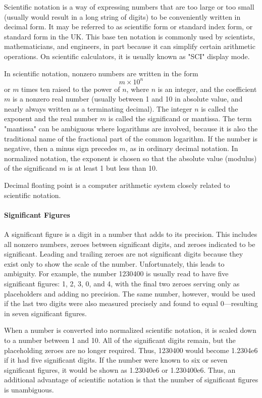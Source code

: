 Scientific notation is a way of expressing numbers that are too large or too small (usually would result in a long string of digits) to be conveniently written in decimal form. It may be referred to as scientific form or standard index form, or standard form in the UK. This base ten notation is commonly used by scientists, mathematicians, and engineers, in part because it can simplify certain arithmetic operations. On scientific calculators, it is usually known as "SCI" display mode.

In scientific notation, nonzero numbers are written in the form
$$
m \times 10^n
$$
or $m$ times ten raised to the power of $n$, where $n$ is an integer, and the coefficient $m$ is a nonzero real number (usually between 1 and 10 in absolute value, and nearly always written as a terminating decimal). The integer $n$ is called the exponent and the real number $m$ is called the significand or mantissa. The term "mantissa" can be ambiguous where logarithms are involved, because it is also the traditional name of the fractional part of the common logarithm. If the number is negative, then a minus sign precedes $m$, as in ordinary decimal notation. In normalized notation, the exponent is chosen so that the absolute value (modulus) of the significand $m$ is at least 1 but less than 10.

Decimal floating point is a computer arithmetic system closely related to scientific notation.

\paragraph{Significant Figures}

A significant figure is a digit in a number that adds to its precision. This includes all nonzero numbers, zeroes between significant digits, and zeroes indicated to be significant. Leading and trailing zeroes are not significant digits because they exist only to show the scale of the number. Unfortunately, this leads to ambiguity. For example, the number 1230400 is usually read to have five significant figures: 1, 2, 3, 0, and 4, with the final two zeroes serving only as placeholders and adding no precision. The same number, however, would be used if the last two digits were also measured precisely and found to equal 0—resulting in seven significant figures.

When a number is converted into normalized scientific notation, it is scaled down to a number between 1 and 10. All of the significant digits remain, but the placeholding zeroes are no longer required. Thus, 1230400 would become 1.2304e6 if it had five significant digits. If the number were known to six or seven significant figures, it would be shown as 1.23040e6 or 1.230400e6. Thus, an additional advantage of scientific notation is that the number of significant figures is unambiguous.

